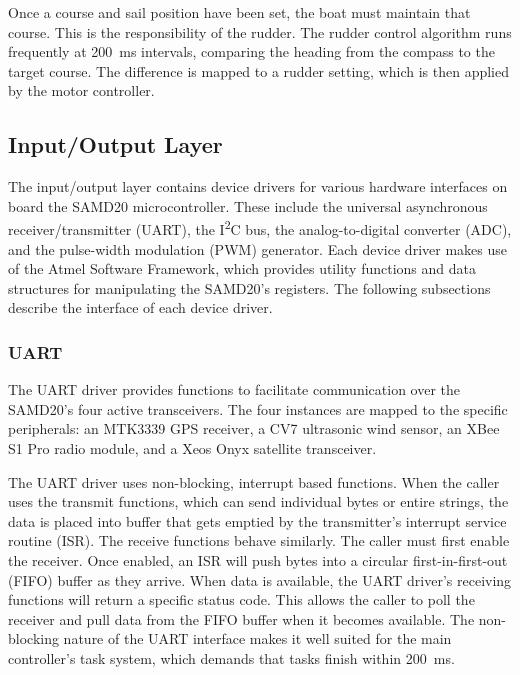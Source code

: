 \documentclass[12pt]{article}
\begin{document}
Once a course and sail position have been set, the boat must maintain that course. This is the responsibility of the rudder. The rudder control algorithm runs frequently at \SI{200}{\milli\second} intervals, comparing the heading from the compass to the target course. The difference is mapped to a rudder setting, which is then applied by the motor controller.

\subsection{Input/Output Layer}
\label{subsec:io}
The input/output layer contains device drivers for various hardware interfaces on board the SAMD20 microcontroller. These include the universal asynchronous receiver/transmitter (UART), the I\textsuperscript{2}C bus, the analog-to-digital converter (ADC), and the pulse-width modulation (PWM) generator. Each device driver makes use of the Atmel Software Framework, which provides utility functions and data structures for manipulating the SAMD20's registers. The following subsections describe the interface of each device driver.

\subsubsection{UART}
\label{subsubsec:uart}
The UART driver provides functions to facilitate communication over the SAMD20's four active transceivers. The four instances are mapped to the specific peripherals: an MTK3339 GPS receiver, a CV7 ultrasonic wind sensor, an XBee S1 Pro radio module, and a Xeos Onyx satellite transceiver.

The UART driver uses non-blocking, interrupt based functions. When the caller uses the transmit functions, which can send individual bytes or entire strings, the data is placed into buffer that gets emptied by the transmitter's interrupt service routine (ISR). The receive functions behave similarly. The caller must first enable the receiver. Once enabled, an ISR will push bytes into a circular first-in-first-out (FIFO) buffer as they arrive. When data is available, the UART driver's receiving functions will return a specific status code. This allows the caller to poll the receiver and pull data from the FIFO buffer when it becomes available. The non-blocking nature of the UART interface makes it well suited for the main controller's task system, which demands that tasks finish within \SI{200}{\milli\second}.
\end{document}
